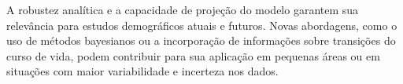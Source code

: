 \documentclass[
  12pt,
  a4paper,
]{scrreprt}
\begin{document}
\vspace{12pt}

A robustez analítica e a capacidade de projeção do modelo garantem sua
relevância para estudos demográficos atuais e futuros. Novas abordagens,
como o uso de métodos bayesianos ou a incorporação de informações sobre
transições do curso de vida, podem contribuir para sua aplicação em
pequenas áreas ou em situações com maior variabilidade e incerteza nos
dados.
\end{document}
